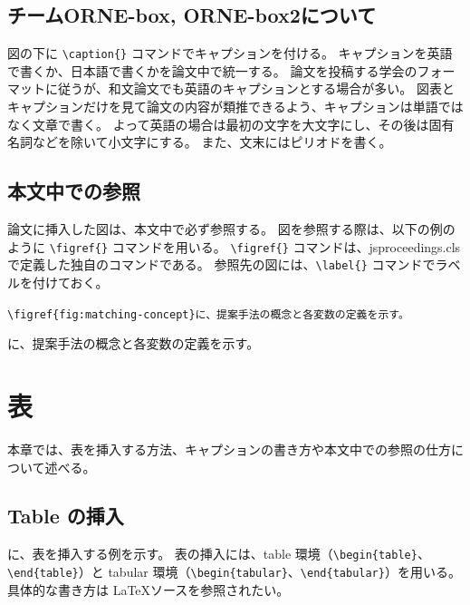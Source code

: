 \documentclass[uplatex, twocolumn, 9pt]{jsproceedings}
\begin{document}
\subsection{チームORNE-box, ORNE-box2について}
図の下に \verb*|\caption{}| コマンドでキャプションを付ける。
キャプションを英語で書くか、日本語で書くかを論文中で統一する。
論文を投稿する学会のフォーマットに従うが、和文論文でも英語のキャプションとする場合が多い。
図表とキャプションだけを見て論文の内容が類推できるよう、キャプションは単語ではなく文章で書く。
よって英語の場合は最初の文字を大文字にし、その後は固有名詞などを除いて小文字にする。
また、文末にはピリオドを書く。

\subsection{本文中での参照}
論文に挿入した図は、本文中で必ず参照する。
図を参照する際は、以下の例のように \verb*|\figref{}| コマンドを用いる。
\verb*|\figref{}| コマンドは、jsproceedings.cls で定義した独自のコマンドである。
参照先の図には、\verb*|\label{}| コマンドでラベルを付けておく。
\begin{description}[style=nextline]
  \item[\LaTeX ソース]%
  \verb|\figref{fig:matching-concept}に、提案手法の概念と各変数の定義を示す。|
  \item[出力]%
  に、提案手法の概念と各変数の定義を示す。
\end{description}


\section{表}
本章では、表を挿入する方法、キャプションの書き方や本文中での参照の仕方について述べる。

\subsection{Table の挿入}
に、表を挿入する例を示す。
表の挿入には、table 環境（\verb*|\begin{table}|、\verb*|\end{table}|）と tabular 環境（\verb*|\begin{tabular}|、\verb*|\end{tabular}|）を用いる。
具体的な書き方は \LaTeX ソースを参照されたい。
\end{document}
